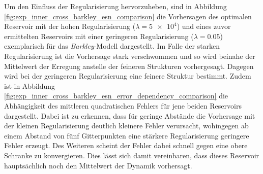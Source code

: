 Um den Einfluss der Regularisierung hervorzuheben, sind in Abbildung \ref{fig:exp_inner_cross_barkley_esn_comparison} die Vorhersagen des optimalen Reservoir mit der hohen Regularisierung ($\lambda=\num{5e4}$) und eines zuvor ermittelten Reservoirs mit einer geringeren Regularisierung ($\lambda=0.05$) exemplarisch für das \textit{Barkley}-Modell dargestellt. Im Falle der starken Regularisierung ist die Vorhersage stark verschwommen und so wird beinahe der Mittelwert der Erregung anstelle der feineren Strukturen vorhergesagt. Dagegen wird bei der geringeren Regularisierung eine feinere Struktur bestimmt. 
Zudem ist in Abbildung \ref{fig:exp_inner_cross_barkley_esn_error_dependency_comparison} die Abhängigkeit des mittleren quadratischen Fehlers für jene beiden Reservoirs dargestellt. Dabei ist zu erkennen, dass für geringe Abstände die Vorhersage mit der kleinen Regularisierung deutlich kleinere Fehler verursacht, wohingegen ab einem Abstand von fünf Gitterpunkten eine stärkere Regularisierung geringere Fehler erzeugt. Des Weiteren scheint der Fehler dabei schnell gegen eine obere Schranke zu konvergieren. Dies lässt sich damit vereinbaren, dass dieses Reservoir hauptsächlich noch den Mittelwert der Dynamik vorhersagt.


